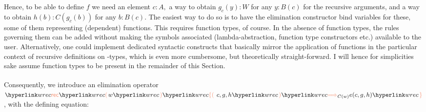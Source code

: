 Hence, to be able to define $f$ we need an element $c:A,$ a way to obtain $g_c(y):W$ for any $y: B(c)$ for the recursive arguments, and a way to obtain $h(b):C(g_c(b))$ for any $b:B(c)$. The easiest way to do so is to have the elimination constructor bind variables for these, some of them representing (dependent) functions. This requires function types, of course. In the absence of function types, the rules governing them can be added without making the symbols associated (lambda-abstraction, function type constructors etc.) available to the user. Alternatively, one could implement dedicated syntactic constructs that basically mirror the application of functions in the particular context of recursive definitions on \wtypesym-types, which is even more cumbersome, but theoretically straight-forward. I will hence for simplicities sake assume function types to be present in the remainder of this Section.

\paragraph{} \hypertarget{wrec}{Consequently, we introduce an elimination operator $\wrec Ww{C(w)}cgh{e(c,g,h)}$, with the defining equation:}

